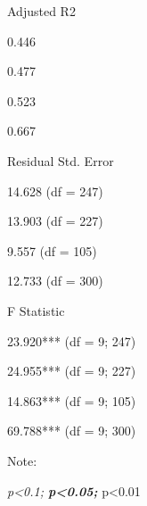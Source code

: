 \documentclass[
  letterpaper,
  DIV=11,
  numbers=noendperiod]{scrartcl}
\begin{document}
Adjusted R2

0.446

0.477

0.523

0.667

Residual Std. Error

14.628 (df = 247)

13.903 (df = 227)

9.557 (df = 105)

12.733 (df = 300)

F Statistic

23.920*** (df = 9; 247)

24.955*** (df = 9; 227)

14.863*** (df = 9; 105)

69.788*** (df = 9; 300)

Note:

\emph{p\textless0.1; \textbf{p\textless0.05; }}p\textless0.01
\end{document}
